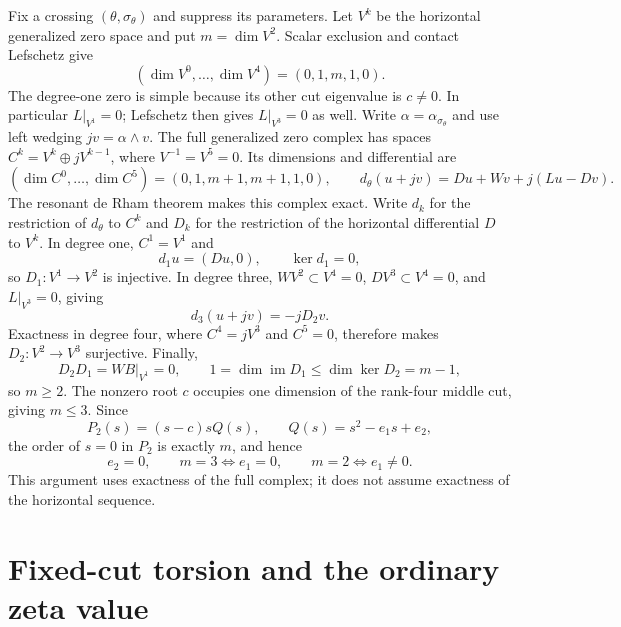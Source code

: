 \documentclass[11pt,letterpaper,reqno]{amsart}
\theoremstyle{remark}
\begin{document}
Fix a crossing $(\theta,\sigma_\theta)$ and suppress its parameters.
Let $V^k$ be the horizontal generalized zero space and put
$m=\dim V^2$. Scalar exclusion and contact Lefschetz give
\[
 (\dim V^0,\ldots,\dim V^4)=(0,1,m,1,0).
\]
The degree-one zero is simple because its other cut eigenvalue is
\(c\neq0\).  In particular \(L|_{V^1}=0\); Lefschetz then gives
\(L|_{V^3}=0\) as well. Write $\alpha=\alpha_{\sigma_\theta}$
and use left wedging $jv=\alpha\wedge v$.
The full generalized zero complex has spaces
$C^k=V^k\oplus jV^{k-1}$, where $V^{-1}=V^5=0$.
Its dimensions and differential are
\begin{equation}\label{xp:full-zero-complex}
 (\dim C^0,\ldots,\dim C^5)=(0,1,m+1,m+1,1,0),
 \qquad
 d_\theta(u+jv)=Du+Wv+j(Lu-Dv).
\end{equation}
The resonant de Rham theorem makes this complex exact. Write $d_k$
for the restriction of $d_\theta$ to $C^k$ and $D_k$ for the restriction
of the horizontal differential $D$ to $V^k$. In degree one,
\(C^1=V^1\) and
\[
 d_1u=(Du,0),
 \qquad \ker d_1=0,
\]
so \(D_1:V^1\to V^2\) is injective.  In degree three,
\(W V^2\subset V^4=0\), \(DV^3\subset V^4=0\), and
\(L|_{V^3}=0\), giving
\[
 d_3(u+jv)=-jD_2v.
\]
Exactness in degree four, where \(C^4=jV^3\) and \(C^5=0\),
therefore makes \(D_2:V^2\to V^3\) surjective.  Finally,
\[
 D_2D_1=WB|_{V^1}=0,
 \qquad
 1=\dim\operatorname{im}D_1
    \leq\dim\ker D_2=m-1,
\]
so \(m\geq2\).  The nonzero root \(c\) occupies one dimension
of the rank-four middle cut, giving \(m\leq3\).  Since
\[
 P_2(s)=(s-c)sQ(s),
 \qquad Q(s)=s^2-e_1s+e_2,
\]
the order of \(s=0\) in \(P_2\) is exactly \(m\), and hence
\begin{equation}\label{two}
 e_2=0,
 \qquad
 m=3\Longleftrightarrow e_1=0,
 \qquad
 m=2\Longleftrightarrow e_1\neq0.
\end{equation}
This argument uses exactness of the full complex; it does not assume
exactness of the horizontal sequence.

\section{Fixed-cut torsion and the ordinary zeta value}\label{sec:normalization}
\end{document}
